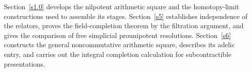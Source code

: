 \documentclass[11pt,a4paper]{article}
\newtheorem{theorem}{Theorem}[section] %
\begin{document}
Section~\ref{s1.0} develops the nilpotent arithmetic square and the
homotopy-limit constructions used to assemble its stages.
Section~\ref{s5} establishes independence of the relators, proves
the field-completion theorem by the filtration argument, and gives
the comparison of free simplicial prounipotent resolutions.
Section~\ref{s6} constructs the general noncommutative arithmetic
square, describes its adelic entry, and carries out the integral
completion calculation for subcontractible presentations.
\end{document}
